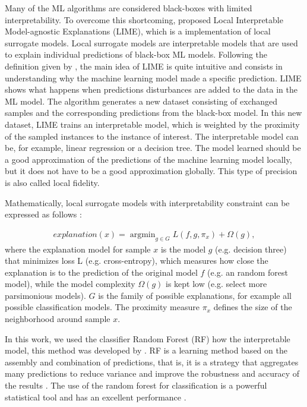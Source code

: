 \documentclass[5p,authoryear,preprint,12pt]{elsarticle}
\DeclareMathOperator*{\argmin}{argmin}
\begin{document}
Many of the ML algorithms are considered black-boxes with limited interpretability. To overcome this shortcoming, \citet{ribeiro2016model} proposed Local Interpretable Model-agnostic Explanations (LIME), which is a implementation of local surrogate models. Local surrogate models are interpretable models that are used to explain individual predictions of black-box ML models. Following the definition given by \citet{molnar2019}, the main idea of LIME is quite intuitive and consists in understanding why the machine learning model made a specific prediction. LIME shows what happens when predictions disturbances are added to the data in the ML model. The algorithm generates a new dataset consisting of exchanged samples and the corresponding predictions from the black-box model. In this new dataset, LIME trains an interpretable model, which is weighted by the proximity of the sampled instances to the instance of interest. The interpretable model can be, for example, linear regression or a decision tree. The model learned should be a good approximation of the predictions of the machine learning model locally, but it does not have to be a good approximation globally. This type of precision is also called local fidelity.

Mathematically, local surrogate models with interpretability constraint can be expressed as follows \citep{molnar2019}:

\begin{eqnarray}\label{local_surrogate_models}
explanation(x) = \argmin_{g\in G}L(f, g, \pi_{x})+\Omega(g),
\end{eqnarray}
where the explanation model for sample $x$ is the model $g$ (e.g. decision three) that minimizes loss L (e.g. cross-entropy), which measures how close the explanation is to the prediction of the original model $f$ (e.g. an random forest model), while the model complexity $\Omega(g)$ is kept low (e.g. select more parsimonious models). $G$ is the family of possible explanations, for example all possible classification models. The proximity measure $\pi_{x}$ defines the size of the neighborhood around sample $x$.

In this work, we used the classifier Random Forest (RF) how the interpretable model, this method was developed by \citet{breiman2001random}. RF is a learning method based on the assembly and combination of predictions, that is, it is a strategy that aggregates many predictions to reduce variance and improve the robustness and accuracy of the results \citep{polikar2012ensemble, friedman2001elements}. The use of the random forest for classification is a powerful statistical tool and has an excellent performance \citep{diaz2006gene}. 
\end{document}
